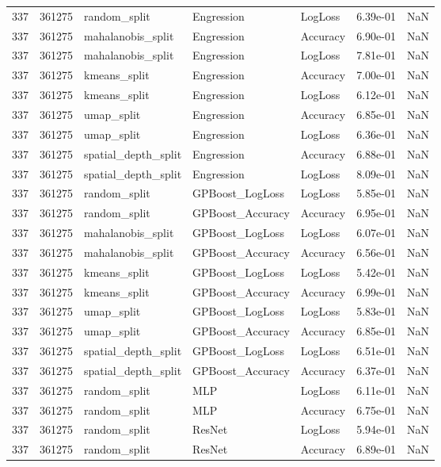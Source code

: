 \begin{tabular}{rrlllrr}
337 & 361275 & random\_split & Engression & LogLoss & 6.39e-01 & NaN \\
337 & 361275 & mahalanobis\_split & Engression & Accuracy & 6.90e-01 & NaN \\
337 & 361275 & mahalanobis\_split & Engression & LogLoss & 7.81e-01 & NaN \\
337 & 361275 & kmeans\_split & Engression & Accuracy & 7.00e-01 & NaN \\
337 & 361275 & kmeans\_split & Engression & LogLoss & 6.12e-01 & NaN \\
337 & 361275 & umap\_split & Engression & Accuracy & 6.85e-01 & NaN \\
337 & 361275 & umap\_split & Engression & LogLoss & 6.36e-01 & NaN \\
337 & 361275 & spatial\_depth\_split & Engression & Accuracy & 6.88e-01 & NaN \\
337 & 361275 & spatial\_depth\_split & Engression & LogLoss & 8.09e-01 & NaN \\
337 & 361275 & random\_split & GPBoost\_LogLoss & LogLoss & 5.85e-01 & NaN \\
337 & 361275 & random\_split & GPBoost\_Accuracy & Accuracy & 6.95e-01 & NaN \\
337 & 361275 & mahalanobis\_split & GPBoost\_LogLoss & LogLoss & 6.07e-01 & NaN \\
337 & 361275 & mahalanobis\_split & GPBoost\_Accuracy & Accuracy & 6.56e-01 & NaN \\
337 & 361275 & kmeans\_split & GPBoost\_LogLoss & LogLoss & 5.42e-01 & NaN \\
337 & 361275 & kmeans\_split & GPBoost\_Accuracy & Accuracy & 6.99e-01 & NaN \\
337 & 361275 & umap\_split & GPBoost\_LogLoss & LogLoss & 5.83e-01 & NaN \\
337 & 361275 & umap\_split & GPBoost\_Accuracy & Accuracy & 6.85e-01 & NaN \\
337 & 361275 & spatial\_depth\_split & GPBoost\_LogLoss & LogLoss & 6.51e-01 & NaN \\
337 & 361275 & spatial\_depth\_split & GPBoost\_Accuracy & Accuracy & 6.37e-01 & NaN \\
337 & 361275 & random\_split & MLP & LogLoss & 6.11e-01 & NaN \\
337 & 361275 & random\_split & MLP & Accuracy & 6.75e-01 & NaN \\
337 & 361275 & random\_split & ResNet & LogLoss & 5.94e-01 & NaN \\
337 & 361275 & random\_split & ResNet & Accuracy & 6.89e-01 & NaN \\

\end{tabular}
